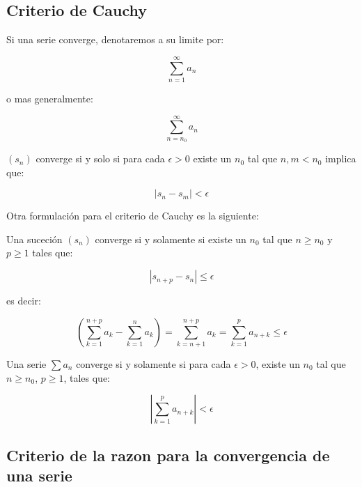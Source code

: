 	\newpage
	\subsection{Criterio de Cauchy}

		Si una serie converge, denotaremos a su limite por:

		\begin{equation}
			\sum_{n=1}^{\infty} a_n
		\end{equation}

		o mas generalmente:

		\begin{equation}
			\sum_{n=n_0}^{\infty} a_n
		\end{equation}

		$(s_n)$ converge si y solo si para cada $\epsilon > 0$ existe un $n_0$ tal que $n, m < n_0$ implica que:

		\begin{equation}
			|s_n - s_m| < \epsilon
		\end{equation}

		Otra formulación para el criterio de Cauchy es la siguiente:

		Una suceción $(s_n)$ converge si y solamente si existe un $n_0$ tal que $n \geq n_0$ y $p \geq 1$ tales que:

		\begin{equation*}
			|s_{n+p} - s_n| \leq \epsilon
		\end{equation*}

		es decir:

		\begin{equation*}
			\left( \sum_{k=1}^{n+p} a_k - \sum_{k=1}^{n} a_k \right) = \sum_{k=n+1}^{n+p} a_k = \sum_{k=1}^{p} a_{n+k} \leq \epsilon
		\end{equation*}

		Una serie $\sum a_n$ converge si y solamente si para cada $\epsilon > 0$, existe un $n_0$ tal que $n \geq n_0$, $p \geq 1$, tales que:

		\begin{equation}
			\left| \sum_{k=1}^{p} a_{n+k} \right| < \epsilon
		\end{equation}

	\newpage
	\subsection{Criterio de la razon para la convergencia de una serie}


